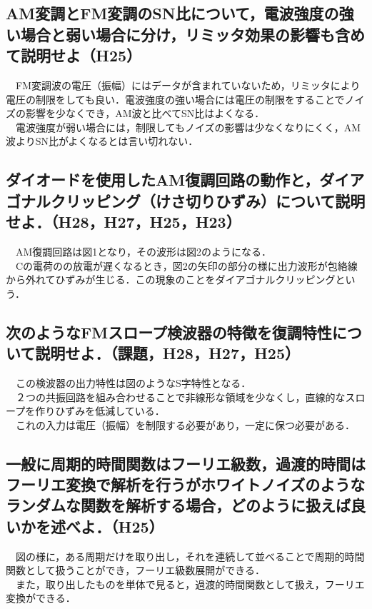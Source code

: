 \subsection{AM変調とFM変調のSN比について，電波強度の強い場合と弱い場合に分け，リミッタ効果の影響も含めて説明せよ（H25）}
　FM変調波の電圧（振幅）にはデータが含まれていないため，リミッタにより電圧の制限をしても良い．電波強度の強い場合には電圧の制限をすることでノイズの影響を少なくでき，AM波と比べてSN比はよくなる．\\
　電波強度が弱い場合には，制限してもノイズの影響は少なくなりにくく，AM波よりSN比がよくなるとは言い切れない．\\

\subsection{ダイオードを使用したAM復調回路の動作と，ダイアゴナルクリッピング（けさ切りひずみ）について説明せよ．（H28，H27，H25，H23）}
\vspace{4cm}
　AM復調回路は図1となり，その波形は図2のようになる．\\
　Cの電荷のの放電が遅くなるとき，図2の矢印の部分の様に出力波形が包絡線から外れてひずみが生じる．この現象のことをダイアゴナルクリッピングという．\\

\subsection{次のようなFMスロープ検波器の特徴を復調特性について説明せよ．（課題，H28，H27，H25）}
\vspace{4cm}
　この検波器の出力特性は図のようなS字特性となる．\\
　２つの共振回路を組み合わせることで非線形な領域を少なくし，直線的なスロープを作りひずみを低減している．\\
　これの入力は電圧（振幅）を制限する必要があり，一定に保つ必要がある．\\

\subsection{一般に周期的時間関数はフーリエ級数，過渡的時間はフーリエ変換で解析を行うがホワイトノイズのようなランダムな関数を解析する場合，どのように扱えば良いかを述べよ．（H25）}
\vspace{4cm}
　図の様に，ある周期だけを取り出し，それを連続して並べることで周期的時間関数として扱うことができ，フーリエ級数展開ができる．\\
　また，取り出したものを単体で見ると，過渡的時間関数として扱え，フーリエ変換ができる．\\

